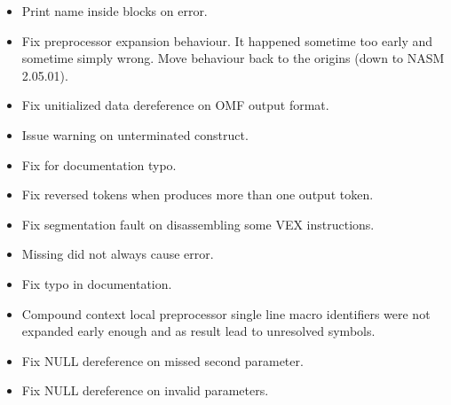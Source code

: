 
\begin{itemize}
    \item{Print  name inside  blocks on error.}
    \item{Fix preprocessor expansion behaviour. It happened sometime
        too early and sometime simply wrong. Move behaviour back to
        the origins (down to NASM 2.05.01).}
    \item{Fix unitialized data dereference on OMF output format.}
    \item{Issue warning on unterminated \code{\%\{} construct.}
    \item{Fix for documentation typo.}
\end{itemize}


\begin{itemize}
    \item{Fix reversed tokens when  produces more than one output token.}
    \item{Fix segmentation fault on disassembling some VEX instructions.}
    \item{Missing  did not always cause error.}
    \item{Fix typo in documentation.}
    \item{Compound context local preprocessor single line macro identifiers
        were not expanded early enough and as result lead to unresolved symbols.}
\end{itemize}


\begin{itemize}
    \item{Fix NULL dereference on missed  second parameter.}
    \item{Fix NULL dereference on invalid  parameters.}
\end{itemize}


